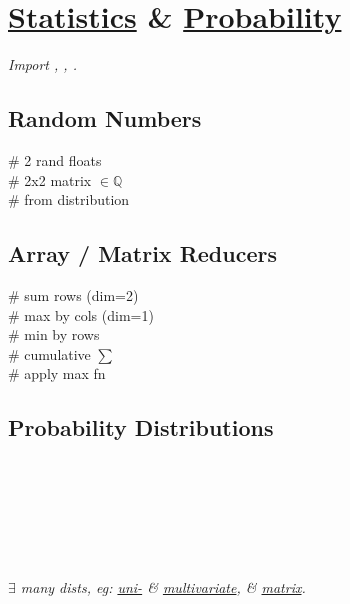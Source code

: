 \section{\href{https://docs.julialang.org/en/v1/stdlib/Statistics/}{Statistics} \& \href{https://juliastats.org/Distributions.jl/stable/}{Probability}}
\textit{Import , , .}


\subsection*{Random Numbers}
 \# 2 rand floats \\
 \# 2x2 matrix $\in \mathbb{Q}$\\
 \# from distribution \\


\subsection*{Array / Matrix Reducers}
 \# sum rows (dim=2) \\
 \# max by cols (dim=1) \\
 \# min by rows \\
 \# cumulative $\sum$ \\
 \# apply max fn \\


\subsection*{Probability Distributions}

\\
\\
\\
\\
\\
\\
\textit{$\exists$ many dists, eg: \href{https://juliastats.org/Distributions.jl/stable/univariate/}{uni-} \& \href{https://juliastats.org/Distributions.jl/stable/multivariate/}{multivariate}, \& \href{https://juliastats.org/Distributions.jl/stable/matrix/}{matrix}.}\\

